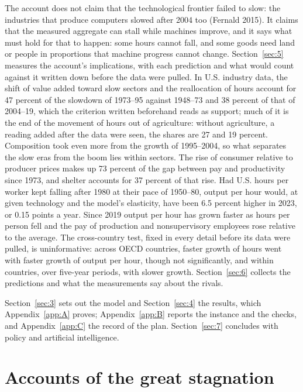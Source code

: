 \documentclass[12pt]{article}
\theoremstyle{plain}
\begin{document}
The account does not claim that the technological frontier failed to slow: the industries that produce computers slowed after 2004 too (Fernald 2015). It claims that the measured aggregate can stall while machines improve, and it says what must hold for that to happen: some hours cannot fall, and some goods need land or people in proportions that machine progress cannot change. 
Section~\ref{sec:5} measures the account's implications, with each prediction and what would count against it written down before the data were pulled. In U.S. industry data, the shift of value added toward slow sectors and the reallocation of hours account for 47 percent of the slowdown of 1973--95 against 1948--73 and 38 percent of that of 2004--19, which the criterion written beforehand reads as support; much of it is the end of the movement of hours out of agriculture: without agriculture, a reading added after the data were seen, the shares are 27 and 19 percent. Composition took even more from the growth of 1995--2004, so what separates the slow eras from the boom lies within sectors. The rise of consumer relative to producer prices makes up 73 percent of the gap between pay and productivity since 1973, and shelter accounts for 37 percent of that rise. Had U.S. hours per worker kept falling after 1980 at their pace of 1950--80, output per hour would, at given technology and the model's elasticity, have been 6.5 percent higher in 2023, or 0.15 points a year. Since 2019 output per hour has grown faster as hours per person fell and the pay of production and nonsupervisory employees rose relative to the average. The cross-country test, fixed in every detail before its data were pulled, is uninformative: across OECD countries, faster growth of hours went with faster growth of output per hour, though not significantly, and within countries, over five-year periods, with slower growth. Section~\ref{sec:6} collects the predictions and what the measurements say about the rivals.

Section~\ref{sec:3} sets out the model and Section~\ref{sec:4} the results, which Appendix~\ref{app:A} proves; Appendix~\ref{app:B} reports the instance and the checks, and Appendix~\ref{app:C} the record of the plan. Section~\ref{sec:7} concludes with policy and artificial intelligence.

\section{Accounts of the great stagnation}\label{sec:2}
\end{document}
